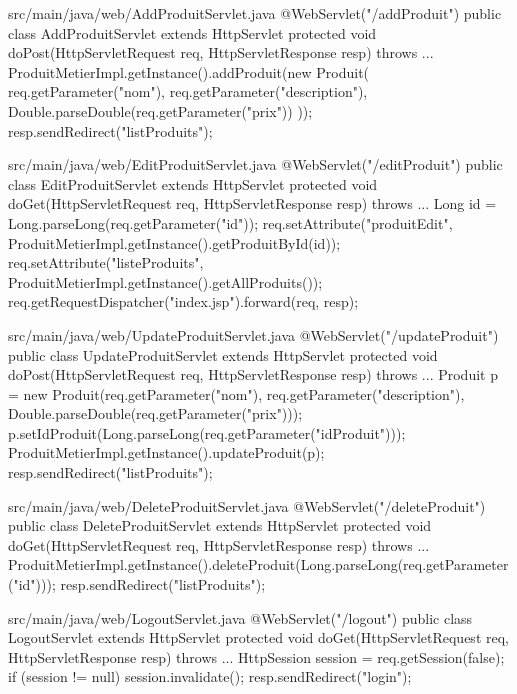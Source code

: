 \documentclass[12pt,a4paper]{article}
\begin{document}
\begin{codeholder}{src/main/java/web/AddProduitServlet.java}
@WebServlet("/addProduit")
public class AddProduitServlet extends HttpServlet {
    protected void doPost(HttpServletRequest req, HttpServletResponse resp) throws ... {
        ProduitMetierImpl.getInstance().addProduit(new Produit(
            req.getParameter("nom"), req.getParameter("description"), 
            Double.parseDouble(req.getParameter("prix"))
        ));
        resp.sendRedirect("listProduits");
    }
}
\end{codeholder}

\begin{codeholder}{src/main/java/web/EditProduitServlet.java}
@WebServlet("/editProduit")
public class EditProduitServlet extends HttpServlet {
    protected void doGet(HttpServletRequest req, HttpServletResponse resp) throws ... {
        Long id = Long.parseLong(req.getParameter("id"));
        req.setAttribute("produitEdit", ProduitMetierImpl.getInstance().getProduitById(id));
        req.setAttribute("listeProduits", ProduitMetierImpl.getInstance().getAllProduits());
        req.getRequestDispatcher("index.jsp").forward(req, resp);
    }
}
\end{codeholder}

\begin{codeholder}{src/main/java/web/UpdateProduitServlet.java}
@WebServlet("/updateProduit")
public class UpdateProduitServlet extends HttpServlet {
    protected void doPost(HttpServletRequest req, HttpServletResponse resp) throws ... {
        Produit p = new Produit(req.getParameter("nom"), req.getParameter("description"), Double.parseDouble(req.getParameter("prix")));
        p.setIdProduit(Long.parseLong(req.getParameter("idProduit")));
        ProduitMetierImpl.getInstance().updateProduit(p);
        resp.sendRedirect("listProduits");
    }
}
\end{codeholder}

\begin{codeholder}{src/main/java/web/DeleteProduitServlet.java}
@WebServlet("/deleteProduit")
public class DeleteProduitServlet extends HttpServlet {
    protected void doGet(HttpServletRequest req, HttpServletResponse resp) throws ... {
        ProduitMetierImpl.getInstance().deleteProduit(Long.parseLong(req.getParameter("id")));
        resp.sendRedirect("listProduits");
    }
}
\end{codeholder}

\begin{codeholder}{src/main/java/web/LogoutServlet.java}
@WebServlet("/logout")
public class LogoutServlet extends HttpServlet {
    protected void doGet(HttpServletRequest req, HttpServletResponse resp) throws ... {
        HttpSession session = req.getSession(false);
        if (session != null) session.invalidate();
        resp.sendRedirect("login");
    }
}
\end{codeholder}
\end{document}
